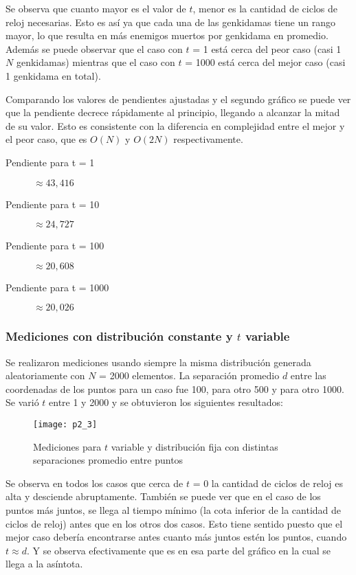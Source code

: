 Se observa que cuanto mayor es el valor de $t$, menor es la cantidad de ciclos de reloj necesarias. Esto es así ya que cada una de las genkidamas tiene un rango mayor, lo que resulta en más enemigos muertos por genkidama en promedio. Además se puede observar que el caso con $t$ = 1 está cerca del peor caso (casi 1 $N$ genkidamas) mientras que el caso con $t$ = 1000 está cerca del mejor caso (casi 1 genkidama en total).

\begin{multicols}{2}
Comparando los valores de pendientes ajustadas y el segundo gráfico se puede ver que la pendiente decrece rápidamente al principio, llegando a alcanzar la mitad de su valor. Esto es consistente con la diferencia en complejidad entre el mejor y el peor caso, que es $O(N)$ y $O(2N)$ respectivamente.

\begin{description}
\item[Pendiente para t = 1] $\approx43,416$
\item[Pendiente para t = 10] $\approx24,727$
\item[Pendiente para t = 100] $\approx20,608$
\item[Pendiente para t = 1000] $\approx20,026$
\end{description}
\end{multicols}

\subsubsection{Mediciones con distribución constante y $t$ variable}

Se realizaron mediciones usando siempre la misma distribución generada aleatoriamente con $N$ = 2000 elementos. La separación promedio $d$ entre las coordenadas de los puntos para un caso fue 100, para otro 500 y para otro 1000. Se varió $t$ entre 1 y 2000 y se obtuvieron los siguientes resultados:

\begin{figure}[h!]
\texttt{[image: p2\_3]}
\caption{Mediciones para $t$ variable y distribución fija con distintas separaciones promedio entre puntos}
\end{figure}

Se observa en todos los casos que cerca de $t$ = 0 la cantidad de ciclos de reloj es alta y desciende abruptamente. También se puede ver que en el caso de los puntos más juntos, se llega al tiempo mínimo (la cota inferior de la cantidad de ciclos de reloj) antes que en los otros dos casos. Esto tiene sentido puesto que el mejor caso debería encontrarse antes cuanto más juntos estén los puntos, cuando $t \approx d$. Y se observa efectivamente que es en esa parte del gráfico en la cual se llega a la asíntota.